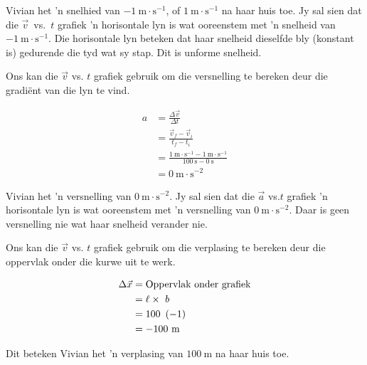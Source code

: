 Vivian het 'n snelhied van $-1~\text{m}\ensuremath{\cdot}\text{s}{}^{-1}$, of $1~\text{m}\ensuremath{\cdot}\text{s}{}^{-1}$ na haar huis toe. Jy sal sien dat die $\vec{v}$~vs.~$t$ grafiek 'n horisontale lyn is wat ooreenstem met 'n snelheid van $-1~\text{m}\ensuremath{\cdot}\text{s}{}^{-1}$. Die horisontale lyn beteken dat haar snelheid dieselfde bly (konstant is) gedurende die tyd wat sy stap. Dit is unforme snelheid.\par 

Ons kan die $\vec{v}$ vs. $t$ grafiek gebruik om die versnelling te bereken deur die gradi\"ent van die lyn te vind.\par 
          
    \begin{align*}
      a&= \frac{\Delta \vec{v}}{\Delta t}\\ 
      &= \frac{\vec{v}_{f}-\vec{v}_{i}}{{t}_{f}-{t}_{i}}\\ 
      &= \frac{1~\text{m}\ensuremath{\cdot}{\text{s}}^{-1}-1~\text{m}\ensuremath{\cdot}{\text{s}}^{-1}}{100~\text{s}-0~\text{s}}\\ 
      &= 0~\text{m}\ensuremath{\cdot}{\text{s}}^{-2}
      \end{align*}

Vivian het 'n versnelling van $0~\text{m}\ensuremath{\cdot}\text{s}{}^{-2}$. Jy sal sien dat die $\vec{a}$ vs.$t$ grafiek 'n horisontale lyn is wat ooreenstem met 'n versnelling van $0~\text{m}\ensuremath{\cdot}\text{s}{}^{-2}$. Daar is geen versnelling nie wat haar snelheid verander nie.\par 


Ons kan die $\vec{v}$ vs. $t$ grafiek gebruik om die verplasing te bereken deur die oppervlak onder die kurwe uit te werk.\par 
        \label{m38795*id70902}\nopagebreak\noindent{}
          
    \begin{align*}
    \Delta \vec{x} &= \text{Oppervlak}~\text{onder}~\text{grafiek}\\ 
		   &= \ell \ensuremath{\times}~b\\ 
		    &= 100~\left(-1\right)\hfill \\  
                    &= -100\text{ m}
      \end{align*}

Dit beteken Vivian het 'n verplasing van $100~\text{m}$ na haar huis toe.\par 

